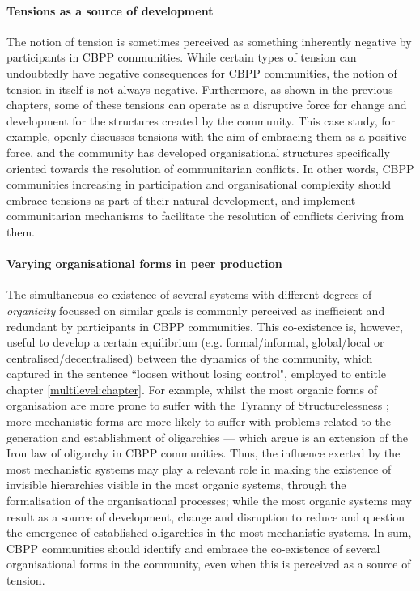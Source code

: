 \paragraph*{Tensions as a source of development}

The notion of tension is sometimes perceived as something inherently negative by participants in CBPP communities. While certain types of tension can undoubtedly have negative consequences for CBPP communities, the notion of tension in itself is not always negative. Furthermore, as shown in the previous chapters, some of these tensions can operate as a disruptive force for change and development for the structures created by the community. This case study, for example, openly discusses \parencite[e.g.][]{conflict-drupal-donna:Online} tensions with the aim of embracing them as a positive force, and the community has developed organisational structures \parencite[e.g.][]{drupal-cwc:2016:Online} specifically oriented towards the resolution of communitarian conflicts. In other words, CBPP communities increasing in participation and organisational complexity should embrace tensions as part of their natural development, and implement communitarian mechanisms to facilitate the resolution of conflicts deriving from them.

\paragraph*{Varying organisational forms in peer production}

The simultaneous co-existence of several systems with different degrees of \textit{organicity} focussed on similar goals is commonly perceived as inefficient and redundant by participants in CBPP communities. This co-existence is, however, useful to develop a certain equilibrium (e.g. formal/informal, global/local or centralised/decentralised) between the dynamics of the community, which \textcite{losen-control:2016:Online} captured in the sentence ``loosen without losing control", employed to entitle chapter \ref{multilevel:chapter}. For example, whilst the most organic forms of organisation are more prone to suffer with the Tyranny of Structurelessness \parencite{freeman2013tyranny}; more mechanistic forms are more likely to suffer with problems related to the generation and establishment of oligarchies --- which \textcite{shaw2014laboratories} argue is an extension of the Iron law of oligarchy \parencite{michels1915political} in CBPP communities. Thus, the influence exerted by the most mechanistic systems may play a relevant role in making the existence of invisible hierarchies visible in the most organic systems, through the formalisation of the organisational processes; while the most organic systems may result as a source of development, change and disruption to reduce and question the emergence of established oligarchies in the most mechanistic systems. In sum, CBPP communities should identify and embrace the co-existence of several organisational forms in the community, even when this is perceived as a source of tension.

